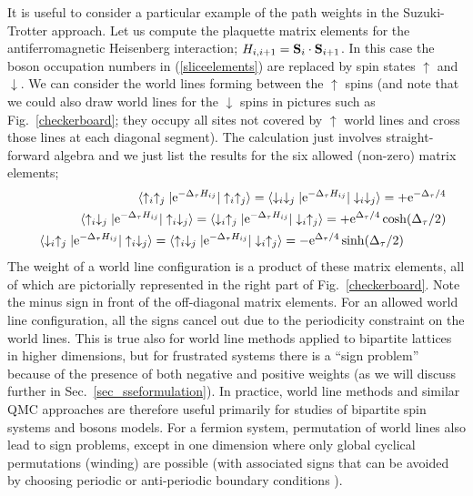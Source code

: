 \documentclass[draft,numberedheadings]{aipproc}
\newcommand{\dn}{\downarrow}
\newcommand{\up}{\uparrow}
\begin{document}
It is useful to consider a particular example of the path weights in the Suzuki-Trotter approach. Let us compute the plaquette matrix elements for the 
antiferromagnetic Heisenberg interaction; $H_{i,i+1}={\bf S}_i \cdot {\bf S}_{i+1}$. In this case the boson occupation numbers in (\ref{sliceelements}) are replaced 
by spin states $\up$ and $\dn$. We can consider the world lines forming between the $\up$ spins (and note that we could also draw world lines for the $\dn$ spins 
in pictures such as Fig.~\ref{checkerboard}; they occupy all sites not covered by $\up$ world lines and cross those lines at each diagonal segment). The calculation 
just involves straight-forward algebra and we just list the results for the six allowed (non-zero) matrix elements;
\begin{eqnarray}
&&\langle \up_i\up_j|{\rm e}^{-\Delta_\tau H_{ij}}|\up_i\up_j\rangle =
  \langle \dn_i\dn_j|{\rm e}^{-\Delta_\tau H_{ij}}|\dn_i\dn_j\rangle = +{\rm e}^{-\Delta_\tau/4} \nonumber \\
&&\langle \up_i\dn_j|{\rm e}^{-\Delta_\tau H_{ij}}|\up_i\dn_j\rangle =
  \langle \dn_i\up_j|{\rm e}^{-\Delta_\tau H_{ij}}|\dn_i\up_j\rangle = +{\rm e}^{\Delta_\tau/4}\cosh(\Delta_\tau/2)\label{trottermatelem}  \\
&&\langle \dn_i\up_j|{\rm e}^{-\Delta_\tau H_{ij}}|\up_i\dn_j\rangle =
  \langle \up_i\dn_j|{\rm e}^{-\Delta_\tau H_{ij}}|\dn_i\up_j\rangle = -{\rm e}^{\Delta_\tau/4}\sinh(\Delta_\tau/2)~~~~~~~~~~\nonumber
\end{eqnarray}
The weight of a world line configuration is a product of these matrix elements, all of which are pictorially represented in the right part of Fig.~\ref{checkerboard}.
Note the minus sign in front of the off-diagonal matrix elements. For an allowed world line configuration, all the signs cancel out due to the periodicity constraint 
on the world lines. This is true also for world line methods applied to bipartite lattices in higher dimensions, but for frustrated systems there is a ``sign problem''
because of the presence of both negative and positive weights (as we will discuss further in Sec.~\ref{sec_sseformulation}). In practice, world line methods and 
similar QMC approaches are therefore useful primarily for studies of bipartite spin systems and bosons models. For a fermion system, 
permutation of world lines also lead to sign problems, except in one dimension where only global cyclical permutations (winding) are possible 
(with associated signs that can be avoided by choosing periodic or anti-periodic boundary conditions \cite{hirsch82,sandvik92}).
\end{document}
